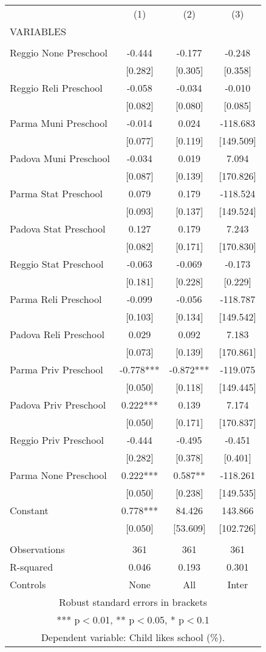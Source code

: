 \begin{tabular}{lccc} \hline
 & (1) & (2) & (3) \\
VARIABLES &  &  &  \\ \hline
 &  &  &  \\
Reggio None Preschool & -0.444 & -0.177 & -0.248 \\
 & [0.282] & [0.305] & [0.358] \\
Reggio Reli Preschool & -0.058 & -0.034 & -0.010 \\
 & [0.082] & [0.080] & [0.085] \\
Parma Muni Preschool & -0.014 & 0.024 & -118.683 \\
 & [0.077] & [0.119] & [149.509] \\
Padova Muni Preschool & -0.034 & 0.019 & 7.094 \\
 & [0.087] & [0.139] & [170.826] \\
Parma Stat Preschool & 0.079 & 0.179 & -118.524 \\
 & [0.093] & [0.137] & [149.524] \\
Padova Stat Preschool & 0.127 & 0.179 & 7.243 \\
 & [0.082] & [0.171] & [170.830] \\
Reggio Stat Preschool & -0.063 & -0.069 & -0.173 \\
 & [0.181] & [0.228] & [0.229] \\
Parma Reli Preschool & -0.099 & -0.056 & -118.787 \\
 & [0.103] & [0.134] & [149.542] \\
Padova Reli Preschool & 0.029 & 0.092 & 7.183 \\
 & [0.073] & [0.139] & [170.861] \\
Parma Priv Preschool & -0.778*** & -0.872*** & -119.075 \\
 & [0.050] & [0.118] & [149.445] \\
Padova Priv Preschool & 0.222*** & 0.139 & 7.174 \\
 & [0.050] & [0.171] & [170.837] \\
Reggio Priv Preschool & -0.444 & -0.495 & -0.451 \\
 & [0.282] & [0.378] & [0.401] \\
Parma None Preschool & 0.222*** & 0.587** & -118.261 \\
 & [0.050] & [0.238] & [149.535] \\
Constant & 0.778*** & 84.426 & 143.866 \\
 & [0.050] & [53.609] & [102.726] \\
 &  &  &  \\
Observations & 361 & 361 & 361 \\
R-squared & 0.046 & 0.193 & 0.301 \\
 Controls & None & All & Inter \\ \hline
\multicolumn{4}{c}{ Robust standard errors in brackets} \\
\multicolumn{4}{c}{ *** p$<$0.01, ** p$<$0.05, * p$<$0.1} \\
\multicolumn{4}{c}{ Dependent variable: Child likes school (\%).} \\
\end{tabular}
